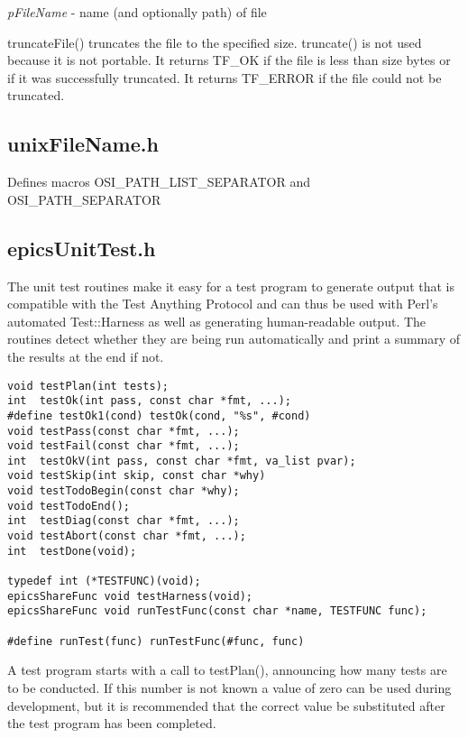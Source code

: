 \begin{description}\item \emph{pFileName} - name (and optionally path) of file

\end{description}truncateFile() truncates the file to the specified size. truncate() is not used because it is not portable. It returns TF\_OK if 
the file is less than size bytes or if it was successfully truncated. It returns TF\_ERROR if the file could not be truncated.

\subsection{unixFileName.h}

Defines macros OSI\_PATH\_LIST\_SEPARATOR and OSI\_PATH\_SEPARATOR

\subsection{epicsUnitTest.h}

The unit test routines make it easy for a test program to generate output that is compatible with the Test Anything Protocol 
and can thus be used with Perl's automated Test::Harness as well as generating human-readable output. The routines 
detect whether they are being run automatically and print a summary of the results at the end if not.

\begin{verbatim}void testPlan(int tests);
int  testOk(int pass, const char *fmt, ...);
#define testOk1(cond) testOk(cond, "%s", #cond)
void testPass(const char *fmt, ...);
void testFail(const char *fmt, ...);
int  testOkV(int pass, const char *fmt, va_list pvar);
void testSkip(int skip, const char *why)
void testTodoBegin(const char *why);
void testTodoEnd();
int  testDiag(const char *fmt, ...);
void testAbort(const char *fmt, ...);
int  testDone(void);

typedef int (*TESTFUNC)(void);
epicsShareFunc void testHarness(void);
epicsShareFunc void runTestFunc(const char *name, TESTFUNC func);

#define runTest(func) runTestFunc(#func, func)
\end{verbatim}
A test program starts with a call to testPlan(), announcing how many tests are to be conducted.  If this number is not 
known a value of zero can be used during development, but it is recommended that the correct value be substituted after 
the test program has been completed.

